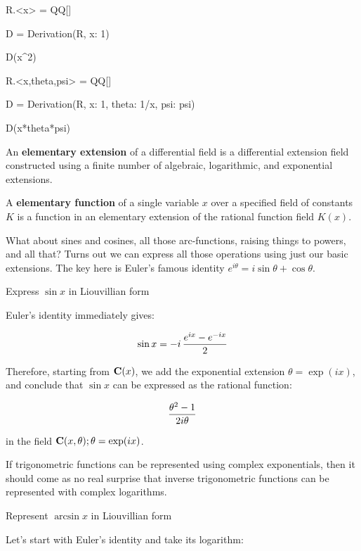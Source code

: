 \begin{sageblock}
R.<x> = QQ[]

D = Derivation(R, {x: 1})

D(x^2)

R.<x,theta,psi> = QQ[]

D = Derivation(R, {x: 1, theta: 1/x, psi: psi})

D(x*theta*psi)

\end{sageblock}


An {\bf elementary extension} of a differential field
is a differential extension field constructed using
a finite number of algebraic, logarithmic, and
exponential extensions.

\enddefinition


A {\bf elementary function} of a single variable $x$ over a specified
field of constants $K$ is a function in an elementary extension of the
rational function field $K(x)$.

\enddefinition

What about sines and cosines, all those arc-functions, raising things
to powers, and all that?  Turns out we can express all those
operations using just our basic extensions.  The key here is Euler's
famous identity $e^{i\theta}=i\sin\theta+\cos\theta$.

\example

Express $\sin x$ in Liouvillian form

Euler's identity immediately gives:

$$\sin x = {-i \,{{e^{ix} - e^{-ix}}\over 2}}$$

Therefore, starting from ${\bf C}(x)$,
we add the exponential extension $\theta = \exp(ix)$,
and conclude that $\sin x$ can be expressed as the rational function:

$${{\theta^2 - 1}\over 2i\theta}$$

in the field ${\bf C}(x,\theta); \theta=\exp(ix)$.

\endexample

If trigonometric functions can be represented using complex
exponentials, then it should come as no real surprise that inverse
trigonometric functions can be represented with complex logarithms.

\example Represent $\arcsin x$ in Liouvillian form

Let's start with Euler's identity and take its logarithm:

